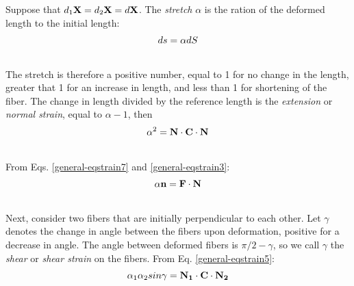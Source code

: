 \documentclass[letterpaper,10pt,english]{sphinxmanual}
\begin{document}
Suppose that $d_1 {\bf X}=d_2 {\bf X}=d {\bf X}$. The \emph{stretch} $\alpha$ is the ration of the deformed length to the initial length:
\label{general:equation-eqstrain7}\begin{gather}
\begin{split}ds = \alpha dS\end{split}\label{general-eqstrain7}\\\begin{split}\end{split}\notag
\end{gather}
The stretch is therefore a positive number, equal to 1 for no change in the length, greater that 1 for an increase in length, and less than 1 for shortening of the fiber. The change in length divided by the reference length is the \emph{extension} or \emph{normal strain}, equal to $\alpha-1$, then
\label{general:equation-eqstrain8}\begin{gather}
\begin{split}\alpha^2 = {\bf N} \cdot {\bf C} \cdot {\bf N}\end{split}\label{general-eqstrain8}\\\begin{split}\end{split}\notag
\end{gather}
From Eqs. \eqref{general-eqstrain7} and \eqref{general-eqstrain3}:
\label{general:equation-eqstrain9}\begin{gather}
\begin{split}\alpha {\bf n} = {\bf F} \cdot {\bf N}\end{split}\label{general-eqstrain9}\\\begin{split}\end{split}\notag
\end{gather}
Next, consider two fibers that are initially perpendicular to each other. Let $\gamma$ denotes the change in angle between the fibers upon deformation, positive for a decrease in angle. The angle between deformed fibers is $\pi/2-\gamma$, so we call $\gamma$ the \emph{shear} or \emph{shear strain} on the fibers. From Eq. \eqref{general-eqstrain5}:
\label{general:equation-eqstrain10}\begin{gather}
\begin{split}\alpha_1 \alpha_2 sin\gamma = {\bf N_1} \cdot {\bf C} \cdot {\bf N_2}\end{split}\label{general-eqstrain10}\\\begin{split}\end{split}\notag
\end{gather}
\end{document}
